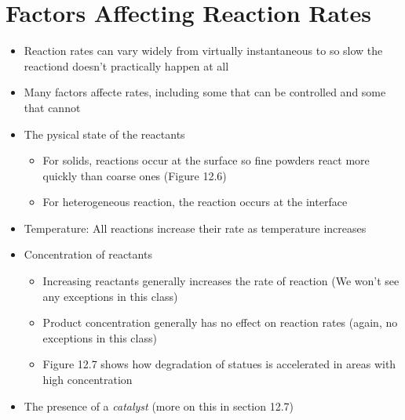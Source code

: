 \documentclass[12pt, openany, letterpaper]{memoir}
\begin{document}
\section{Factors Affecting Reaction Rates}
\begin{itemize}
  \item Reaction rates can vary widely from virtually instantaneous to so slow the reactiond doesn't practically happen at all
  \item Many factors affecte rates, including some that can be controlled and some that cannot
  \item The pysical state of the reactants 
  \begin{itemize}
    \item For solids, reactions occur at the surface so fine powders react more quickly than coarse ones (Figure 12.6)
    \item For heterogeneous reaction, the reaction occurs at the interface
  \end{itemize}
  \item Temperature: All reactions increase their rate as temperature increases
  \item Concentration of reactants
  \begin{itemize}
    \item Increasing reactants generally increases the rate of reaction (We won't see any exceptions in this class)
    \item Product concentration generally has no effect on reaction rates (again, no exceptions in this class)
    \item Figure 12.7 shows how degradation of statues is accelerated in areas with high  concentration
  \end{itemize}
\item The presence of a \emph{catalyst} (more on this in section 12.7)
\end{itemize}
\end{document}

